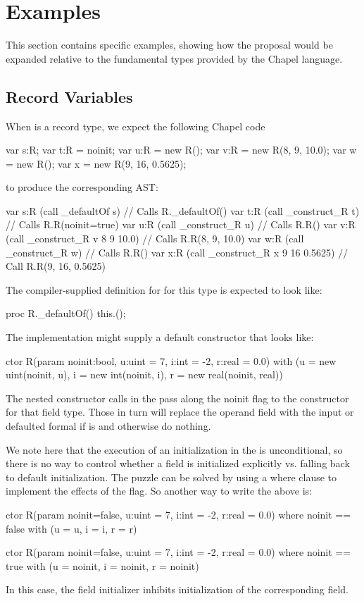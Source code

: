 \section{Examples}
\label{Examples}

This section contains specific examples, showing how the proposal would be expanded
relative to the fundamental types provided by the Chapel language.

\subsection{Record Variables}

When  is a record type, we expect the following Chapel code
\begin{chapel}
  var s:R;
  var t:R = noinit;
  var u:R = new R();
  var v:R = new R(8, 9, 10.0);
  var w = new R();
  var x = new R(9, 16, 0.5625);
\end{chapel}
\noindent
to produce the corresponding AST:
\begin{numberedchapel}
  var s:R
  (call _defaultOf s) // Calls R._defaultOf()
  var t:R
  (call _construct_R t) // Calls R.R(noinit=true)
  var u:R
  (call _construct_R u) // Calls R.R()
  var v:R
  (call _construct_R v 8 9 10.0) // Calls R.R(8, 9, 10.0)
  var w:R
  (call _construct_R w) // Calls R.R()
  var x:R
  (call _construct_R x 9 16 0.5625) // Call R.R(9, 16, 0.5625)
\end{numberedchapel}
The compiler-supplied definition for  for this type is expected to look
like:
\begin{chapel}
  proc R._defaultOf() {
    this.();
  }
\end{chapel}
The implementation might supply a default constructor that looks like:
\begin{chapel}
  ctor R(param noinit:bool, u:uint = 7, i:int = -2, r:real = 0.0)
    with (u = new uint(noinit, u),
          i = new int(noinit, i),
          r = new real(noinit, real)) 
  { }
\end{chapel}
\noindent
The nested constructor calls in the  pass along the noinit flag
to the constructor for that field type.  Those in turn will replace the operand
field with the input or defaulted formal if  is  and otherwise do
nothing.

We note here that the execution of an initialization in the  is
unconditional, so there is no way to control whether a field is initialized explicitly
vs. falling back to default initialization.  The puzzle can be solved by using a where
clause to implement the effects of the  flag.  So another way to write the
above is:
\begin{chapel}
  ctor R(param noinit=false, u:uint = 7, i:int = -2, r:real = 0.0)
    where noinit == false
    with (u = u, i = i, r = r)
  { }

  ctor R(param noinit=false, u:uint = 7, i:int = -2, r:real = 0.0)
    where noinit == true
    with (u = noinit, i = noinit, r = noinit)
  { }
\end{chapel}
\noindent
In this case, the  field initializer inhibits initialization of the
corresponding field.  

